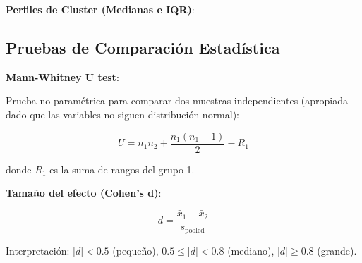\documentclass[12pt,letterpaper,twoside]{report}
\begin{document}
\begin{calculobox}
\textbf{Perfiles de Cluster (Medianas e IQR)}:

\begin{table}[H]
\centering
\caption{Perfiles de Cluster: Estadísticos Descriptivos}
\label{tab:cluster_profiles}
\end{table}
\end{calculobox}

\subsection{Pruebas de Comparación Estadística}

\begin{estadisticobox}
\textbf{Mann-Whitney U test}:

Prueba no paramétrica para comparar dos muestras independientes (apropiada dado que las variables no siguen distribución normal):

\begin{equation}
U = n_1 n_2 + \frac{n_1(n_1+1)}{2} - R_1
\end{equation}

donde $R_1$ es la suma de rangos del grupo 1.

\textbf{Tamaño del efecto (Cohen's d)}:

\begin{equation}
d = \frac{\bar{x}_1 - \bar{x}_2}{s_{\text{pooled}}}
\end{equation}

Interpretación: $|d| < 0.5$ (pequeño), $0.5 \leq |d| < 0.8$ (mediano), $|d| \geq 0.8$ (grande).
\end{estadisticobox}
\end{document}
